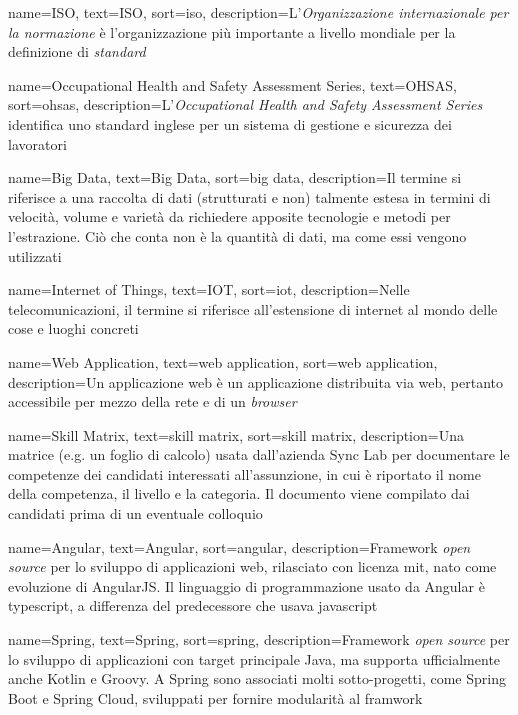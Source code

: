 {
    name=ISO,
    text=ISO,
    sort=iso,
    description={L'\emph{Organizzazione internazionale per la normazione} è l'organizzazione più importante a livello mondiale per la definizione di \textit{standard}}
}

{
    name=Occupational Health and Safety Assessment Series,
    text=OHSAS,
    sort=ohsas,
    description={L'\emph{Occupational Health and Safety Assessment Series} identifica uno standard inglese per un sistema di gestione e sicurezza dei lavoratori}
}

{
    name=Big Data,
    text=Big Data,
    sort=big data,
    description={Il termine si riferisce a una raccolta di dati (strutturati e non) talmente estesa in termini di velocità, volume e varietà da richiedere apposite tecnologie e metodi per l'estrazione. Ciò che conta non è la quantità di dati, ma come essi vengono utilizzati}
}

{
    name=Internet of Things,
    text=IOT,
    sort=iot,
    description={Nelle telecomunicazioni, il termine si riferisce all'estensione di internet al mondo delle cose e luoghi concreti}
}

{
    name=Web Application,
    text=web application,
    sort=web application,
    description={Un applicazione web è un applicazione distribuita via web, pertanto accessibile per mezzo della rete e di un \emph{browser}}
}

{
    name=Skill Matrix,
    text=skill matrix,
    sort=skill matrix,
    description={Una matrice (e.g. un foglio di calcolo) usata dall'azienda Sync Lab per documentare le competenze dei candidati interessati all'assunzione, in cui è riportato il nome della competenza, il livello e la categoria. Il documento viene compilato dai candidati prima di un eventuale colloquio}
}

{
    name=Angular,
    text=Angular,
    sort=angular,
    description={Framework \textit{open source} per lo sviluppo di applicazioni web, rilasciato con licenza \gls{mit}, nato come evoluzione di AngularJS. Il linguaggio di programmazione usato da Angular è \gls{typescript}, a differenza del predecessore che usava \gls{javascript}}
}

{
    name=Spring,
    text=Spring,
    sort=spring,
    description={Framework \textit{open source} per lo sviluppo di applicazioni con target principale Java, ma supporta ufficialmente anche Kotlin e Groovy. A Spring sono associati molti sotto-progetti, come Spring Boot e Spring Cloud, sviluppati per fornire modularità al framwork}
}

